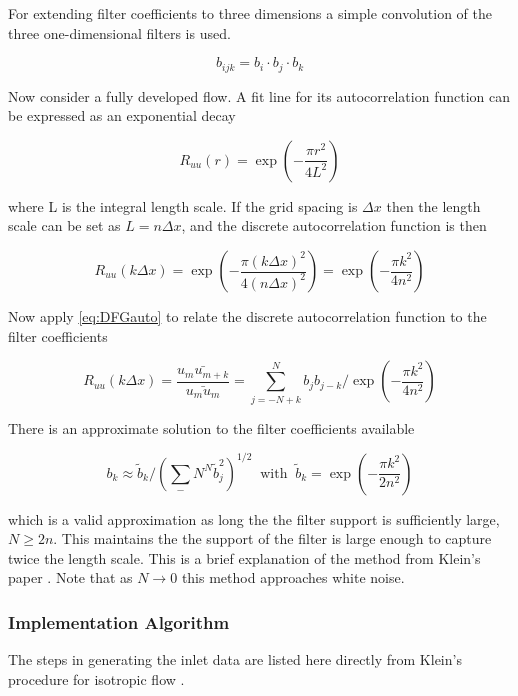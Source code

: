 For extending filter coefficients to three dimensions a simple convolution of the three one-dimensional filters is used.

\begin{equation} \label{eq:DFG3D}
b_{ijk} = b_i \cdot b_j \cdot b_k
\end{equation}

Now consider a fully developed flow.  A fit line for its autocorrelation function can be expressed as an exponential decay

\begin{equation}
R_{uu} (r) = \exp \left( - \frac{ \pi r^2}{4 L^2} \right)
\end{equation}

where L is the integral length scale. If the grid spacing is $\Delta x$ then the length scale can be set as $L = n \Delta x$, and the discrete autocorrelation function is then

\begin{equation}
R_{uu} ( k \Delta x) = \exp \left( - \frac{ \pi (k \Delta x)^2}{4 (n \Delta x)^2} \right) = \exp \left( - \frac{ \pi k^2}{4 n^2} \right)
\end{equation}

Now apply \ref{eq:DFGauto} to relate the discrete autocorrelation function to the filter coefficients

\begin{equation}
R_{uu} (k \Delta x) = \frac{ \bar{ u_m u_{m+k} } }{ \bar{u_m u_m} } = \sum_{j=-N+k}^N b_j b_{j-k} \big/ \exp \left( - \frac{ \pi k^2}{4 n^2} \right)
\end{equation}

There is an approximate solution to the filter coefficients available

\begin{equation} \label{eq:DFGfiltercoef}
b_k \approx \tilde{b}_k \big/ \left(  \sum_-N^N  \tilde{b}_j^2 \right)^{1/2} \; \; \text{with} \; \; \tilde{b}_k = \exp \left( - \frac{ \pi k^2}{2 n^2} \right)
\end{equation}

which is a valid approximation as long the the filter support is sufficiently large, $N \geq 2n$.  This maintains the the support of the filter is large enough to capture twice the length scale. This is a brief explanation of the method from Klein's paper \cite{Klein2003}. Note that as $ N \rightarrow 0$ this method approaches white noise.

\subsubsection{Implementation Algorithm}
The steps in generating the inlet data are listed here directly from Klein's procedure for isotropic flow \cite{Klein2003}.

